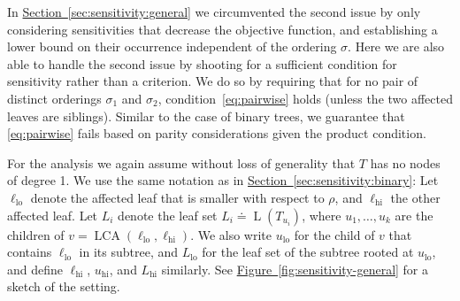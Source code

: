 \documentclass[11pt]{article}
\numberwithin{equation}{section}
\theoremstyle{definition}
\theoremstyle{plain}
\newcommand{\expref}[2]{\hyperref[#2]{#1~\ref{#2}}}
\DeclareMathOperator{\LCA}{LCA}
\DeclareMathOperator{\leafset}{L}
\newcommand{\ranking}{\rho}
\newcommand{\ordering}{\sigma}
\newcommand{\lo}{\mathrm{lo}}
\newcommand{\hi}{\mathrm{hi}}
\begin{document}
In \expref{Section}{sec:sensitivity:general} we circumvented the second issue by only considering sensitivities that decrease the objective function, and establishing a lower bound on their occurrence independent of the ordering $\ordering$. Here we are also able to handle the second issue by shooting for a sufficient condition for sensitivity rather than a criterion. We do so by requiring that for no pair of distinct orderings $\ordering_1$ and $\ordering_2$, condition~\eqref{eq:pairwise} holds (unless the two affected leaves are siblings). Similar to the case of binary trees, we guarantee that \eqref{eq:pairwise} fails based on parity considerations given the product condition. 

For the analysis we again assume without loss of generality that $T$ has no nodes of degree 1. We use the same notation as in \expref{Section}{sec:sensitivity:binary}: Let  $\ell_\lo$ denote the affected leaf that is smaller with respect to $\ranking$, and $\ell_\hi$ the other affected leaf. Let $L_i$ denote the leaf set $L_i \doteq \leafset(T_{u_i})$, where $u_1, \dots, u_k$ are the children of $v = \LCA(\ell_\lo,\ell_\hi)$. We also write $u_\lo$ for the child of $v$ that contains $\ell_\lo$ in its subtree, and $L_\lo$ for the leaf set of the subtree rooted at $u_\lo$, and define $\ell_\hi$, $u_\hi$, and $L_\hi$ similarly. See \expref{Figure}{fig:sensitivity-general} for a sketch of the setting.
\end{document}
